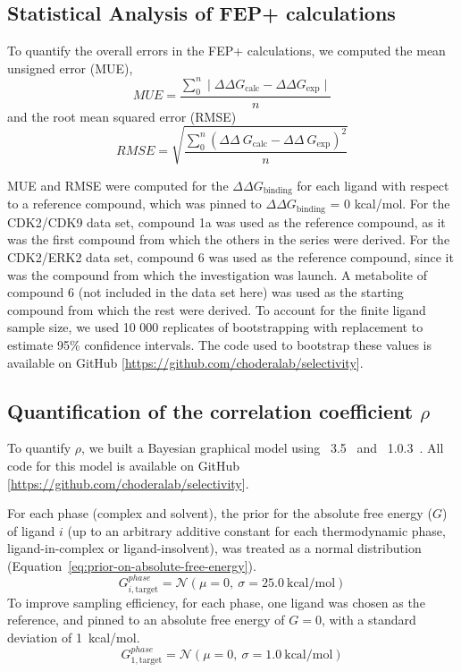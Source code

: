 \documentclass[phd,tocprelim]{cornell}
\begin{document}
\subsection{Statistical Analysis of FEP+ calculations}

To quantify the overall errors in the FEP+ calculations, we computed the mean unsigned error (MUE),
\begin{equation}\label{eq:sample-mue}
MUE = \frac{ \sum_{0}^{n} \mid \Delta \Delta G _\text{calc} - \Delta \Delta G _\text{exp} \mid}{n}
\end{equation}
and the root mean squared error (RMSE)
\begin{equation}\label{eq:sample-rmse}
RMSE = \sqrt{\frac{ \sum_{0}^{n}(\Delta \Delta~G_\text{calc} - \Delta \Delta~G_\text{exp})^2}{n}}
\end{equation}

MUE and RMSE were computed for the $\Delta \Delta G_{\text{binding}}$ for each ligand with respect to a reference compound, which was pinned to $\Delta \Delta G_{\text{binding}}$ = 0 kcal/mol. For the CDK2/CDK9 data set, compound 1a was used as the reference compound, as it was the first compound from which the others in the series were derived. For the CDK2/ERK2 data set, compound 6 was used as the reference compound, since it was the compound from which the investigation was launch. A metabolite of compound 6 (not included in the data set here) was used as the starting compound from which the rest were derived. To account for the finite ligand sample size, we used 10 000 replicates of bootstrapping with replacement to estimate  95\% confidence intervals.
The code used to bootstrap these values is available on GitHub [\url{https://github.com/choderalab/selectivity}].


\subsection{Quantification of the correlation coefficient $\rho$}
To quantify $\rho$, we built a Bayesian graphical model using ~3.5~\citep{Salvatier:2016ki} and ~1.0.3~\citep{2016arXiv160502688full}.
All code for this model is available on GitHub [\url{https://github.com/choderalab/selectivity}].

For each phase (complex and solvent), the prior for the absolute free energy ($G$) of ligand $i$ (up to an arbitrary additive constant for each thermodynamic phase, ligand-in-complex or ligand-insolvent), was treated as a normal distribution (Equation~\ref{eq:prior-on-absolute-free-energy}). 
\begin{equation}\label{eq:prior-on-absolute-free-energy}
G^{phase}_{i,\text{target}} = \mathcal{N}(\mu=0,~\sigma=25.0~\text{kcal/mol})
\end{equation}
To improve sampling efficiency, for each phase, one ligand was chosen as the reference, and pinned to an absolute free energy of $G = 0$, with a standard deviation of 1~kcal/mol.
\begin{equation}\label{eq:prior-on-absolute-free-energy}
G^{phase}_{1,\text{target}} = \mathcal{N}(\mu=0,~\sigma=1.0~\text{kcal/mol})
\end{equation}
\end{document}
